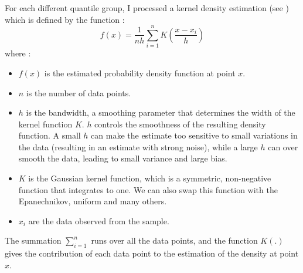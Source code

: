 \documentclass[12pt]{article}
\begin{document}
For each different quantile group, I processed a kernel density estimation (see \cite{EMParzen}) which is defined by the function : 
\begin{equation}
f(x) = \frac{1}{nh} \sum_{i=1}^{n} K\left(\frac{x - x_i}{h}\right)
\end{equation}
where : 
\begin{itemize}
    \item \( f(x) \) is the estimated probability density function at point \( x \).
    \item \( n \) is the number of data points.
    \item \( h \) is the bandwidth, a smoothing parameter that determines the width of the kernel function \( K \). \( h \) controls the smoothness of the resulting density function. A small \( h \) can make the estimate too sensitive to small variations in the data (resulting in an estimate with strong noise), while a large \( h\) can over smooth the data, leading to small variance and large bias.
    \item  \( K \) is the Gaussian kernel function, which is a symmetric, non-negative function that integrates to one. We can also swap this function with the Epanechnikov, uniform and many others.
    \item \( x_i \) are the data observed from the sample.
\end{itemize}



The summation \( \sum_{i=1}^{n} \) runs over all the data points, and the function \( K\left(.\right)\) gives the contribution of each data point to the estimation of the density at point \( x \). 
\end{document}
